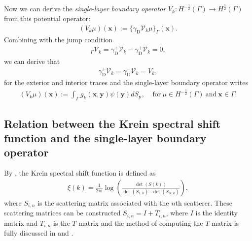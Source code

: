 Now we can derive the \emph{single-layer boundary operator}
$V_{k}: H^{-\frac{1}{2}}(\Gamma)\rightarrow H^{\frac{1}{2}}(\Gamma)$ from this potential operator:
\begin{align*}
    (V_{k}\mu)(\boldsymbol{x}) := \{\gamma_{\text{D}}\mathcal{V}_{k}\mu\}_{\Gamma}(\boldsymbol{x}).
\end{align*}
Combining with the jump condition
\begin{align*}
    [\gamma_{\text{D}}]_{\Gamma}\mathcal{V}_{k} = \gamma_{\text{D}}^{+}\mathcal{V}_{k} - \gamma_{\text{D}}^{+}\mathcal{V}_{k} = 0, 
\end{align*}
we can derive that 
\begin{align*}
    \gamma_{\text{D}}^{+}\mathcal{V}_{k} = \gamma_{\text{D}}^{-}\mathcal{V}_{k} = V_{k},
\end{align*}
for the exterior and interior traces and the single-layer boundary operator writes 
\begin{align*}
    (V_{k}\mu)(\boldsymbol{x}) := \int_{\Gamma}g_{k}(\boldsymbol{x},\boldsymbol{y})\psi(\boldsymbol{y})dS_{\boldsymbol{y}}, \ \ \ \ \ 
    \text{for}\ \mu\in H^{-\frac{1}{2}}(\Gamma) \  \text{and} \ \boldsymbol{x}\in\Gamma.
\end{align*}
\subsection{Relation between the Krein spectral shift function and the single-layer boundary operator}
By \cite{hanisch2020relative}, the Krein spectral shift function is defined as 
\begin{align*}
    \xi(k) = \frac{1}{2\pi \mathrm{i}}\log\left(\frac{\det(S(k))}{\det(S_{1,k})\cdots\det(S_{N,k})}\right),
\end{align*}
where $S_{i,n}$ is the scattering matrix associated with the $n$th scatterer. These scattering matrices can be constructed  $S_{i,n} = I + T_{i,n}$, where 
$I$ is the identity matrix and $T_{i,n}$ is the $T$-matrix and the method of computing the $T$-matrix is fully discussed in \cite{waterman1969new} and 
\cite{ganesh2008far}.

